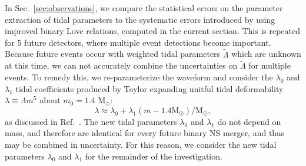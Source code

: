 \documentclass[prd,twocolumn,nofootinbib,superscriptaddress,amsmath,amssymb]{revtex4-1}
\begin{document}
In Sec.~\ref{sec:observations}, we compare the statistical errors on the parameter extraction of tidal parameters to the systematic errors introduced by using improved binary Love relations, computed in the current section.
This is repeated for 5 future detectors, where multiple event detections become important.
Because future events occur with weighted tidal parameters $\tilde\Lambda$ which are unknown at this time, we can not accurately combine the uncertainties on $\tilde\Lambda$ for multiple events.
To remedy this, we re-parameterize the waveform and consider the $\lambda_0$ and $\lambda_1$ tidal coefficients produced by Taylor expanding unitful tidal deformability $\lambda \equiv \Lambda m^5$ about $m_0=1.4\text{ M}_{\odot}$:
\begin{equation}
\lambda \approx \lambda_0 + \lambda_1 (m-1.4 \text{M}_{\odot})/\text{M}_{\odot},
\end{equation}
as discussed in Ref.~\cite{delPozzo:TaylorTidal}.
The new tidal parameters $\lambda_0$ and $\lambda_1$ do not depend on mass, and therefore are identical for every future binary NS merger, and thus may be combined in uncertainty.
For this reason, we consider the new tidal parameters $\lambda_0$ and $\lambda_1$ for the remainder of the investigation.
\end{document}

